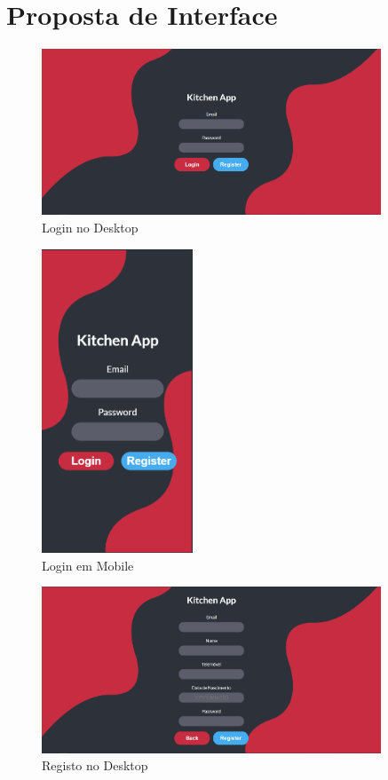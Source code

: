\documentclass[a4paper]{report}
\begin{document}
\chapter{Proposta de Interface}
    \begin{figure}[H]
    \centering
            \includegraphics[width=0.9\textwidth]{images/mockup/login_desktop.png}
            \caption{Login no Desktop}
    \end{figure}
    \begin{figure}[H]
    \centering
            \includegraphics[width=0.4\textwidth]{images/mockup/login_mobile.png}
            \caption{Login em Mobile}
    \end{figure}
    \begin{figure}[H]
    \centering
            \includegraphics[width=0.9\textwidth]{images/mockup/register_desktop.png}
            \caption{Registo no Desktop}
    \end{figure}
\end{document}
